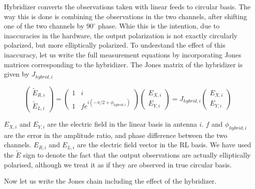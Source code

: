 \documentclass{article}
\begin{document}
Hybridizer converts the observations taken with linear feeds to circular basis. The way this is done is combining the observations in the two channels, after shifting one of the two channels by $90^\circ$ phase. Whie this is the intention, due to inaccuracies in the hardware, the output polarization is not exactly circularly polarized, but more elliptically polarized. To understand the effect of this inaccuracy, let us write the full measurement equations by incorporating Jones matrices corresponding to the hybridizer. The Jones matrix of the hybridizer is given by $J_{hybrid,i}$ 

\begin{equation}
\begin{pmatrix}
\tilde{E}_{R,i} \\
\tilde{E}_{L,i}
\end{pmatrix}=
\begin{pmatrix}
1 & i\\
1 & fe^{i \left (-\pi/2+\phi_{hybrid,i}\right )}
\end{pmatrix}
\begin{pmatrix}
E_{X,i} \\
E_{Y,i}
\end{pmatrix}=J_{hybrid,i}
\begin{pmatrix}
E_{X,i} \\
E_{Y,i}
\end{pmatrix}
\end{equation}

$E_{X,i}$ and $E_{Y,i}$ are the electric field in the linear basis in antenna $i$. $f$ and $\phi_{hybrid,i}$ are the error in the amplitude ratio, and phase difference between the two channels. $E_{R,i}$ and $E_{L,i}$ are the electric field vector in the RL basis. We have used the $\tilde{E}$ sign to denote the fact that the output observations are actually elliptically polarised, although we treat it as if they are observed in true circular basis. 

Now let us write the Jones chain including the effect of the hybridizer.
\end{document}
